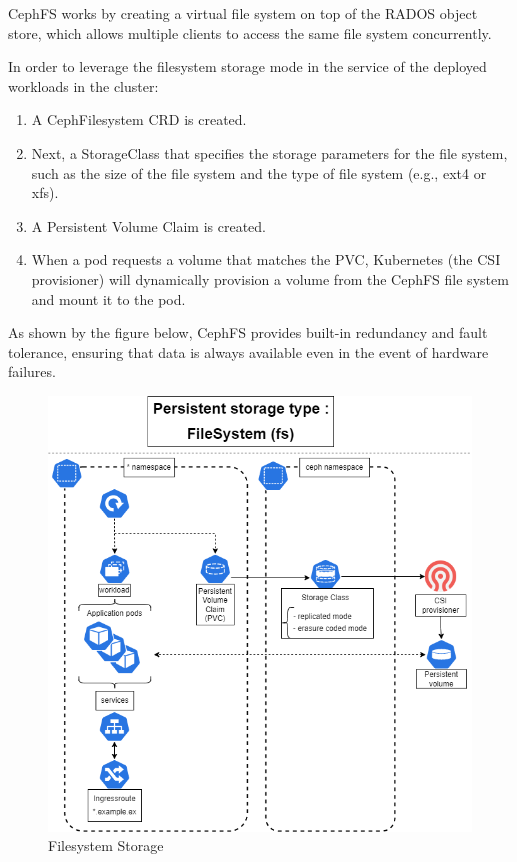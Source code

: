 
CephFS works by creating a virtual file system on top of the RADOS object store, which allows multiple clients to access the same file system concurrently. 

In order to leverage the filesystem storage mode in the service of the deployed workloads in the cluster: 
\begin{enumerate}[label = (\arabic*)]
    \item A CephFilesystem CRD is created. 
    \item Next, a StorageClass that specifies the storage parameters for the file system, such as the size of the file system and the type of file system (e.g., ext4 or xfs). 
    \item A Persistent Volume Claim is created. 
    \item When a pod requests a volume that matches the PVC, Kubernetes (the CSI provisioner) will dynamically provision a volume from the CephFS file system and mount it to the pod. 
\end{enumerate}
As shown by the figure below, CephFS provides built-in redundancy and fault tolerance, ensuring that data is always available even in the event of hardware failures. 
\begin{figure}[H]\centering
\includegraphics[width=1.0\textwidth,angle=00]{assets/f31.png}
\caption{Filesystem Storage}
\label{fig:Filesystem Storage}
\end{figure}

